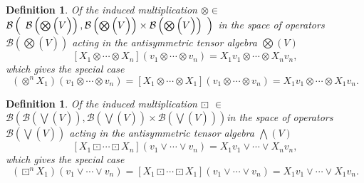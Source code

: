 \documentclass[aps,preprint]{revtex4}%
\newtheorem{definition}[theorem]{Definition}
\begin{document}
\begin{definition}
Of the induced multiplication $\otimes\in$ $\mathcal{B}\left(
\begin{array}
[c]{c}%
\mathcal{B}\left(
{\textstyle\bigotimes}
\left(  \overset{}{V}\right)  \right)  ,\mathcal{B}\left(
{\textstyle\bigotimes}
\left(  \overset{}{V}\right)  \right)  \times\mathcal{B}\left(
{\textstyle\bigotimes}
\left(  \overset{}{V}\right)  \right) \\
\end{array}
\right)  $ in the space of operators $\mathcal{B}\left(
{\textstyle\bigotimes}
\left(  \overset{}{V}\right)  \right)  $ acting in the antisymmetric tensor
algebra $%
{\textstyle\bigotimes}
\left(  V\right)  $
\begin{equation}
\left[  X_{1}\otimes\cdots\otimes X_{n}\right]  \left(  v_{1}\otimes
\cdots\otimes v_{n}\right)  =X_{1}v_{1}\otimes\cdots\otimes X_{n}v_{n},
\end{equation}
which gives the special case
\begin{equation}
\left(  \otimes^{n}X_{1}\right)  \left(  v_{1}\otimes\cdots\otimes
v_{n}\right)  =\left[  X_{1}\otimes\cdots\otimes X_{1}\right]  \left(
v_{1}\otimes\cdots\otimes v_{n}\right)  =X_{1}v_{1}\otimes\cdots\otimes
X_{1}v_{n}.
\end{equation}

\end{definition}

\begin{definition}
Of the induced multiplication $\boxdot$ $\in$ $\mathcal{B}\left(
\mathcal{B}\left(
{\textstyle\bigvee}
\left(  \overset{}{V}\right)  \right)  ,\mathcal{B}\left(
{\textstyle\bigvee}
\left(  \overset{}{V}\right)  \right)  \times\mathcal{B}\left(
{\textstyle\bigvee}
\left(  \overset{}{V}\right)  \right)  \right)  $in the space of operators
$\mathcal{B}\left(
{\textstyle\bigvee}
\left(  \overset{}{V}\right)  \right)  $ acting in the antisymmetric tensor
algebra $%
{\textstyle\bigwedge}
\left(  V\right)  $
\begin{equation}
\left[  X_{1}\boxdot\cdots\boxdot X_{n}\right]  \left(  v_{1}\vee\cdots\vee
v_{n}\right)  =X_{1}v_{1}\vee\cdots\vee X_{n}v_{n},
\end{equation}
which gives the special case
\begin{equation}
\left(  \boxdot^{n}X_{1}\right)  \left(  v_{1}\vee\cdots\vee v_{n}\right)
=\left[  X_{1}\boxdot\cdots\boxdot X_{1}\right]  \left(  v_{1}\vee\cdots\vee
v_{n}\right)  =X_{1}v_{1}\vee\cdots\vee X_{1}v_{n}.
\end{equation}

\end{definition}
\end{document}
